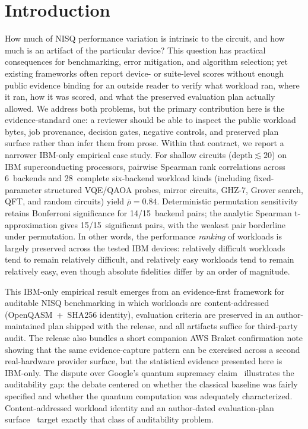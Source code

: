 \documentclass[aps,prxquantum,twocolumn,superscriptaddress,amsmath,amssymb,longbibliography,floatfix]{revtex4-2}
\begin{document}
\maketitle

\section{Introduction}
\label{sec:intro}

How much of NISQ performance variation is intrinsic to the circuit, and how much is an artifact of the particular device? This question has practical consequences for benchmarking, error mitigation, and algorithm selection; yet existing frameworks often report device- or suite-level scores without enough public evidence binding for an outside reader to verify what workload ran, where it ran, how it was scored, and what the preserved evaluation plan actually allowed. We address both problems, but the primary contribution here is the evidence-standard one: a reviewer should be able to inspect the public workload bytes, job provenance, decision gates, negative controls, and preserved plan surface rather than infer them from prose. Within that contract, we report a narrower IBM-only empirical case study. For shallow circuits ($\text{depth} \lesssim 20$) on IBM superconducting processors, pairwise Spearman rank correlations across 6~backends and 28~complete six-backend workload kinds (including fixed-parameter structured VQE/QAOA probes, mirror circuits, GHZ-7, Grover search, QFT, and random circuits) yield $\bar{\rho} = 0.84$. Deterministic permutation sensitivity retains Bonferroni significance for 14/15~backend pairs; the analytic Spearman t-approximation gives 15/15~significant pairs, with the weakest pair borderline under permutation. In other words, the performance \emph{ranking} of workloads is largely preserved across the tested IBM devices: relatively difficult workloads tend to remain relatively difficult, and relatively easy workloads tend to remain relatively easy, even though absolute fidelities differ by an order of magnitude.

This IBM-only empirical result emerges from an evidence-first framework for auditable NISQ benchmarking in which workloads are content-addressed (OpenQASM~+~SHA256 identity), evaluation criteria are preserved in an author-maintained plan shipped with the release, and all artifacts suffice for third-party audit. The release also bundles a short companion AWS Braket confirmation note showing that the same evidence-capture pattern can be exercised across a second real-hardware provider surface, but the statistical evidence presented here is IBM-only. The dispute over Google's quantum supremacy claim~\cite{Arute2019} illustrates the auditability gap: the debate centered on whether the classical baseline was fairly specified and whether the quantum computation was adequately characterized. Content-addressed workload identity and an author-dated evaluation-plan surface~\cite{Nosek2018} target exactly that class of auditability problem.
\end{document}
